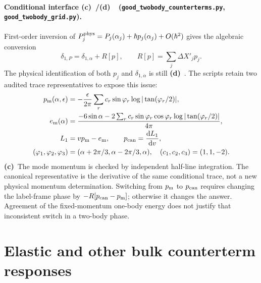 \documentclass[11pt,a4paper]{article}
\newcommand{\Cc}{\textbf{(c)}\ }
\newcommand{\Cd}{\textbf{(d)}\ }
\newcommand{\dd}{\mathrm d}
\newcommand{\file}[1]{\nolinkurl{#1}}
\newcommand{\ct}{\file{good_twobody_counterterms.py}}
\newcommand{\grid}{\file{good_twobody_grid.py}}
\begin{document}
\paragraph{Conditional interface \Cc/\Cd\ (\ct, \grid).}
First-order inversion of
\(P_j^{\rm phys}=P_j(\alpha_j)+\hbar p_j(\alpha_j)+O(\hbar^2)\)
gives the algebraic conversion
\begin{equation}
 \delta_{1,P}=\delta_{1,\alpha}+R[p],\qquad
 R[p]=\sum_j\Delta X'_jp_j.
 \label{eq:conversion}
\end{equation}
The physical identification of both \(p_j\) and
\(\delta_{1,\alpha}\) is still \Cd. The scripts retain two audited
trace representatives to expose this issue:
\begin{align}
 p_{\rm m}(\alpha,\epsilon)
 &=-\frac{\epsilon}{2\pi}\sum_r c_r\sin\varphi_r
                 \log|\tan(\varphi_r/2)|,\\
 e_{\rm m}(\alpha)
 &=\frac{-6\sin\alpha-2\sum_r c_r\sin\varphi_r\cos\varphi_r
                    \log|\tan(\varphi_r/2)|}{4\pi},\\
 L_1&=vp_{\rm m}-e_{\rm m},\qquad p_{\rm can}=\frac{\dd L_1}{\dd v},\\
 (\varphi_1,\varphi_2,\varphi_3)
 &=(\alpha+2\pi/3,\alpha-2\pi/3,\alpha),\quad(c_1,c_2,c_3)=(1,1,-2).
 \label{eq:charges}
\end{align}
\Cc The mode momentum is checked by independent half-line integration.
The canonical representative is the derivative of the same conditional
trace, not a new physical momentum determination. Switching from
\(p_{\rm m}\) to \(p_{\rm can}\) requires changing the label-frame
phase by \(-R[p_{\rm can}-p_{\rm m}]\); otherwise it changes the answer.
Agreement of the fixed-momentum one-body energy does not justify that
inconsistent switch in a two-body phase.

\section{Elastic and other bulk counterterm responses}
\end{document}
